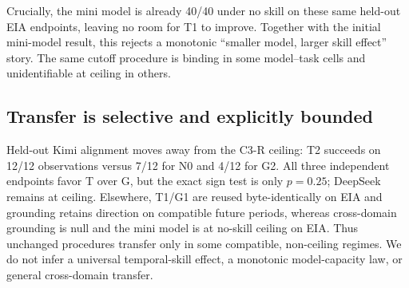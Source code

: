Crucially, the mini model is already 40/40 under no skill on these same held-out EIA endpoints, leaving no room for T1 to improve. Together with the initial mini-model result, this rejects a monotonic ``smaller model, larger skill effect'' story. The same cutoff procedure is binding in some model--task cells and unidentifiable at ceiling in others.

\subsection{Transfer is selective and explicitly bounded}
Held-out Kimi alignment moves away from the C3-R ceiling: T2 succeeds on 12/12 observations versus 7/12 for N0 and 4/12 for G2. All three independent endpoints favor T over G, but the exact sign test is only $p=0.25$; DeepSeek remains at ceiling. Elsewhere, T1/G1 are reused byte-identically on EIA and grounding retains direction on compatible future periods, whereas cross-domain grounding is null and the mini model is at no-skill ceiling on EIA. Thus unchanged procedures transfer only in some compatible, non-ceiling regimes. We do not infer a universal temporal-skill effect, a monotonic model-capacity law, or general cross-domain transfer.
